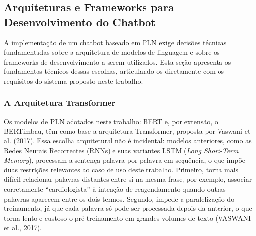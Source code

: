 \documentclass[12pt,a4paper]{extarticle}
\begin{document}
\subsection{Arquiteturas e Frameworks para Desenvolvimento do Chatbot}

A implementação de um chatbot baseado em PLN exige decisões técnicas fundamentadas sobre a arquitetura de modelos de linguagem e sobre os frameworks de desenvolvimento a serem utilizados. Esta seção apresenta os fundamentos técnicos dessas escolhas, articulando-os diretamente com os requisitos do sistema proposto neste trabalho.

\subsubsection{A Arquitetura Transformer}

%

Os modelos de PLN adotados neste trabalho: BERT e, por extensão, o BERTimbau, têm como base a arquitetura Transformer, proposta por Vaswani et al. (2017). Essa escolha arquitetural não é incidental: modelos anteriores, como as Redes Neurais Recorrentes (RNNs) e suas variantes LSTM (\textit{Long Short-Term Memory}), processam a sentença palavra por palavra em sequência, o que impõe duas restrições relevantes ao caso de uso deste trabalho. Primeiro, torna mais difícil relacionar palavras distantes entre si na mesma frase, por exemplo, associar corretamente ``cardiologista'' à intenção de reagendamento quando outras palavras aparecem entre os dois termos. Segundo, impede a paralelização do treinamento, já que cada palavra só pode ser processada depois da anterior, o que torna lento e custoso o pré-treinamento em grandes volumes de texto (VASWANI et al., 2017).
\end{document}
